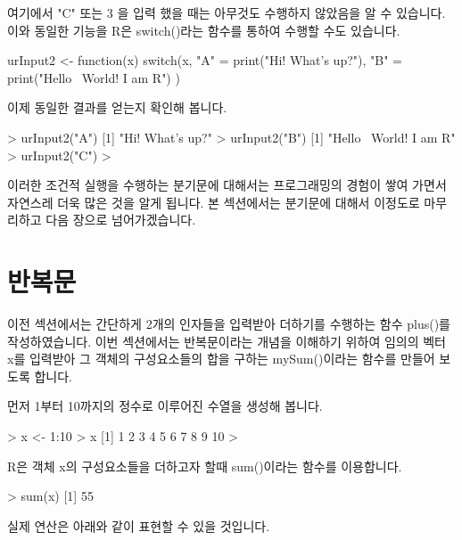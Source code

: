 여기에서 "C" 또는 3 을 입력 했을 때는 아무것도 수행하지 않았음을 알 수 있습니다. 
이와 동일한 기능을 R은 switch()라는 함수를 통하여 수행할 수도 있습니다. 

\begin{Schunk}
\begin{Soutput}
urInput2 <- function(x){
	switch(x, 
		"A" = print("Hi! What's up?"),
		"B" = print("Hello~ World! I am R")
	)
}
\end{Soutput}
\end{Schunk}

이제 동일한 결과를 얻는지 확인해 봅니다. 

\begin{Schunk}
\begin{Soutput}
> urInput2("A")
[1] "Hi! What's up?"
> urInput2("B")
[1] "Hello~ World! I am R"
> urInput2("C")
>
\end{Soutput}
\end{Schunk}

이러한 조건적 실행을 수행하는 분기문에 대해서는 프로그래밍의 경험이 쌓여 가면서 자연스레 더욱 많은 것을 알게 됩니다. 
본 섹션에서는 분기문에 대해서 이정도로 마무리하고 다음 장으로 넘어가겠습니다. 


\section{반복문}

이전 섹션에서는 간단하게 2개의 인자들을 입력받아 더하기를 수행하는 함수 plus()를 작성하였습니다.
이번 섹션에서는 반복문이라는 개념을 이해하기 위하여 임의의 벡터 x를 입력받아 그 객체의 구성요소들의 합을 구하는 mySum()이라는 함수를 만들어 보도록 합니다. 

먼저 1부터 10까지의 정수로 이루어진 수열을 생성해 봅니다.

\begin{Schunk}
\begin{Soutput}
> x <- 1:10
> x
 [1]  1  2  3  4  5  6  7  8  9 10
> 
\end{Soutput}
\end{Schunk}

R은 객체 x의 구성요소들을 더하고자 할때 sum()이라는 함수를 이용합니다.

\begin{Schunk}
\begin{Soutput}
> sum(x)
[1] 55
\end{Soutput}
\end{Schunk}

실제 연산은 아래와 같이 표현할 수 있을 것입니다.

